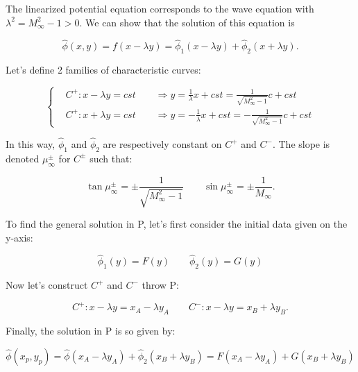 	The linearized potential equation corresponds to the wave equation with $\lambda ^2 = M_\infty ^2 -1 >0$. We can show that the solution of this equation is 
	
	\begin{equation}
	\hat{\phi}(x,y)= f(x-\lambda y) = \hat{\phi} _{1}(x-\lambda y) + \hat{\phi} _{2} (x+\lambda y).
	\end{equation}		
	
	Let's define 2 families of characteristic curves:
	
	\begin{equation}
	\left\{
	\begin{aligned}
	&C^+ : x-\lambda y = cst \qquad \Rightarrow y = \frac{1}{\lambda} x + cst = \frac{1}{\sqrt{M_\infty ^2 -1}} c + cst\\
	&C^+ : x+\lambda y = cst \qquad \Rightarrow y = -\frac{1}{\lambda} x + cst = -\frac{1}{\sqrt{M_\infty ^2 -1}} c + cst
	\end{aligned}
	\right.
	\end{equation}
	
	In this way, $\hat{\phi} _1$ and $\hat{\phi} _2$ are respectively constant on $C^+$ and $C^-$. The slope is denoted $\mu _\infty ^\pm$ for $C^\pm$ such that: 
	
	\begin{equation}
	\tan \mu _\infty ^\pm = \pm \frac{1}{\sqrt{M_\infty ^2 -1}} \qquad \sin \mu _\infty ^\pm = \pm \frac{1}{M_\infty}.
	\end{equation}
	
	To find the general solution in P, let's first consider the initial data given on the y-axis: 
	
	\begin{equation}
	\hat{\phi} _1(y) = F(y)\qquad \hat{\phi}_2 (y) = G(y)
	\end{equation}
	
	Now let's construct $C^+$ and $C^-$ throw P: 
	
	\begin{equation}
	C^+ : x-\lambda y = x_A - \lambda y_A\qquad C^- : x-\lambda y = x_B + \lambda y_B.
	\end{equation}
	
	Finally, the solution in P is so given by:
	
	\begin{equation}
	\hat{ \phi} (x_p,y_p) = \hat{\phi} (x_A - \lambda y_A) + \hat{\phi} _2 (x_B + \lambda y_B) = F (x_A - \lambda y_A) + G (x_B + \lambda y_B)
	\end{equation}

